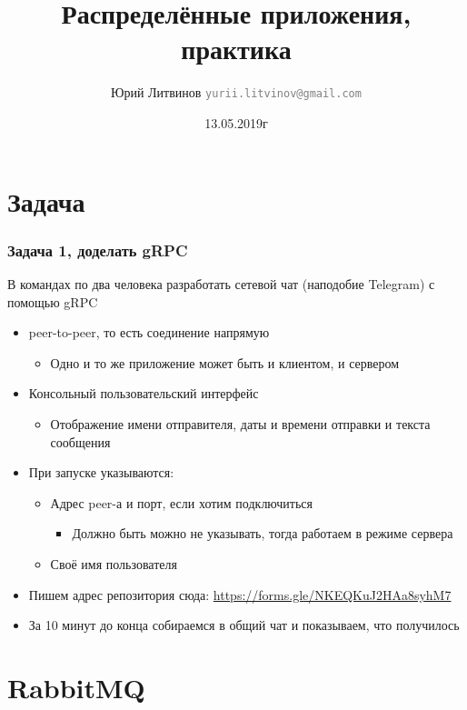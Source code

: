 \documentclass[xetex,mathserif,serif]{beamer}
\title{Распределённые приложения, практика}
\author[Юрий Литвинов]{Юрий Литвинов \newline \textcolor{gray}{\small\texttt{yurii.litvinov@gmail.com}}}
\date{13.05.2019г}
\begin{document}
    \frame{\titlepage}

    \section{Задача}

    \begin{frame}
        \frametitle{Задача 1, доделать gRPC}
        \begin{footnotesize}
            В командах по два человека разработать сетевой чат (наподобие Telegram) с помощью gRPC
            \begin{itemize}
                \item peer-to-peer, то есть соединение напрямую
                \begin{itemize}
                    \item Одно и то же приложение может быть и клиентом, и сервером
                \end{itemize}
                \item Консольный пользовательский интерфейс
                \begin{itemize}
                    \item Отображение имени отправителя, даты и времени отправки и текста сообщения
                \end{itemize}
                \item При запуске указываются:
                \begin{itemize}
                    \item Адрес peer-а и порт, если хотим подключиться
                    \begin{itemize}
                        \item Должно быть можно не указывать, тогда работаем в режиме сервера
                    \end{itemize}
                    \item Своё имя пользователя
                \end{itemize}
                \item Пишем адрес репозитория сюда: \url{https://forms.gle/NKEQKuJ2HAa8syhM7}
                \item За 10 минут до конца собираемся в общий чат и показываем, что получилось
            \end{itemize}
        \end{footnotesize}
    \end{frame}

    \section{RabbitMQ}
\end{document}
